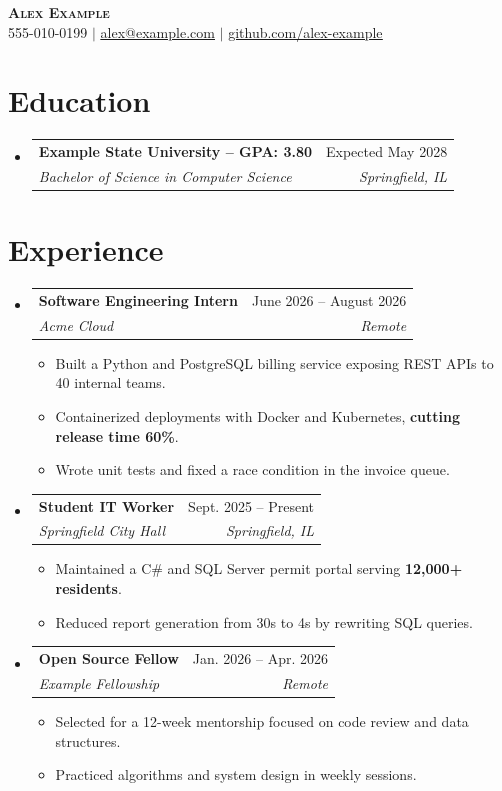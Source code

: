 \documentclass[letterpaper,11pt]{article}
\makeatletter
\newcommand{\resumeItem}[1]{
  \item\small{
    {#1 \vspace{-2pt}}
  }
}
\newcommand{\resumeSubheading}[4]{
  \vspace{-2pt}\item
    \begin{tabular*}{0.97\textwidth}[t]{l@{\extracolsep{\fill}}r}
      \textbf{#1} & #2 \\
      \textit{\small#3} & \textit{\small #4} \\
    \end{tabular*}\vspace{-7pt}
}
\newcommand{\resumeSubHeadingListStart}{\begin{itemize}[leftmargin=0.15in, label={}]}
\newcommand{\resumeSubHeadingListEnd}{\end{itemize}}
\newcommand{\resumeItemListStart}{\begin{itemize}}
\newcommand{\resumeItemListEnd}{\end{itemize}\vspace{-6pt}}
\makeatother
\begin{document}
\begin{center}
    \textbf{\Huge \scshape Alex Example} \\ \vspace{1pt}
    \small 555-010-0199 $|$ \href{mailto:alex@example.com}{\underline{alex@example.com}} $|$
    \href{https://github.com/alex-example}{\underline{github.com/alex-example}}
\end{center}

\section{Education}
  \resumeSubHeadingListStart
    \resumeSubheading
      {Example State University -- GPA: 3.80}{Expected May 2028}
      {Bachelor of Science in Computer Science}{Springfield, IL}
  \resumeSubHeadingListEnd

\section{Experience}
  \resumeSubHeadingListStart
\resumeSubheading
  {Software Engineering Intern}{June 2026 -- August 2026}
  {Acme Cloud}{Remote}
\resumeItemListStart
  \resumeItem{Built a Python and PostgreSQL billing service exposing REST APIs to 40 internal teams.}
  \resumeItem{Containerized deployments with Docker and Kubernetes, \textbf{cutting release time 60\%}.}
  \resumeItem{Wrote unit tests and fixed a race condition in the invoice queue.}
\resumeItemListEnd
\resumeSubheading
  {Student IT Worker}{Sept. 2025 -- Present}
  {Springfield City Hall}{Springfield, IL}
\resumeItemListStart
  \resumeItem{Maintained a C\# and SQL Server permit portal serving \textbf{12{,}000+ residents}.}
  \resumeItem{Reduced report generation from 30s to 4s by rewriting SQL queries.}
\resumeItemListEnd
\resumeSubheading
  {Open Source Fellow}{Jan. 2026 -- Apr. 2026}
  {Example Fellowship}{Remote}
\resumeItemListStart
  \resumeItem{Selected for a 12-week mentorship focused on code review and data structures.}
  \resumeItem{Practiced algorithms and system design in weekly sessions.}
\resumeItemListEnd
  \resumeSubHeadingListEnd
\end{document}
